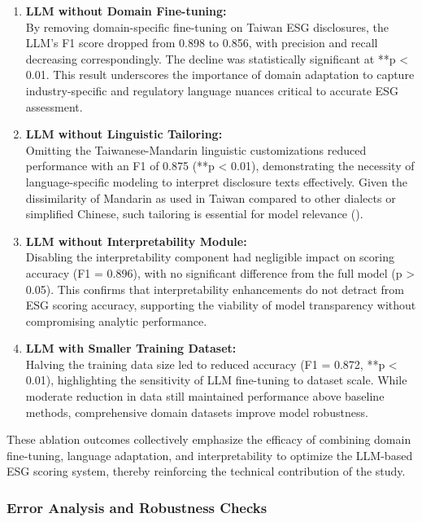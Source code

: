 \documentclass[
  12pt,
]{article}
\begin{document}
\begin{enumerate}
\def\labelenumi{\arabic{enumi}.}
\item
  \textbf{LLM without Domain Fine-tuning:}\\
  By removing domain-specific fine-tuning on Taiwan ESG disclosures, the
  LLM's F1 score dropped from 0.898 to 0.856, with precision and recall
  decreasing correspondingly. The decline was statistically significant
  at **p \textless{} 0.01. This result underscores the importance of
  domain adaptation to capture industry-specific and regulatory language
  nuances critical to accurate ESG assessment.
\item
  \textbf{LLM without Linguistic Tailoring:}\\
  Omitting the Taiwanese-Mandarin linguistic customizations reduced
  performance with an F1 of 0.875 (**p \textless{} 0.01), demonstrating
  the necessity of language-specific modeling to interpret disclosure
  texts effectively. Given the dissimilarity of Mandarin as used in
  Taiwan compared to other dialects or simplified Chinese, such
  tailoring is essential for model relevance
  ().
\item
  \textbf{LLM without Interpretability Module:}\\
  Disabling the interpretability component had negligible impact on
  scoring accuracy (F1 = 0.896), with no significant difference from the
  full model (p \textgreater{} 0.05). This confirms that
  interpretability enhancements do not detract from ESG scoring
  accuracy, supporting the viability of model transparency without
  compromising analytic performance.
\item
  \textbf{LLM with Smaller Training Dataset:}\\
  Halving the training data size led to reduced accuracy (F1 = 0.872,
  **p \textless{} 0.01), highlighting the sensitivity of LLM fine-tuning
  to dataset scale. While moderate reduction in data still maintained
  performance above baseline methods, comprehensive domain datasets
  improve model robustness.
\end{enumerate}

These ablation outcomes collectively emphasize the efficacy of combining
domain fine-tuning, language adaptation, and interpretability to
optimize the LLM-based ESG scoring system, thereby reinforcing the
technical contribution of the study.

\subsubsection{Error Analysis and Robustness
Checks}\label{error-analysis-and-robustness-checks}
\end{document}
